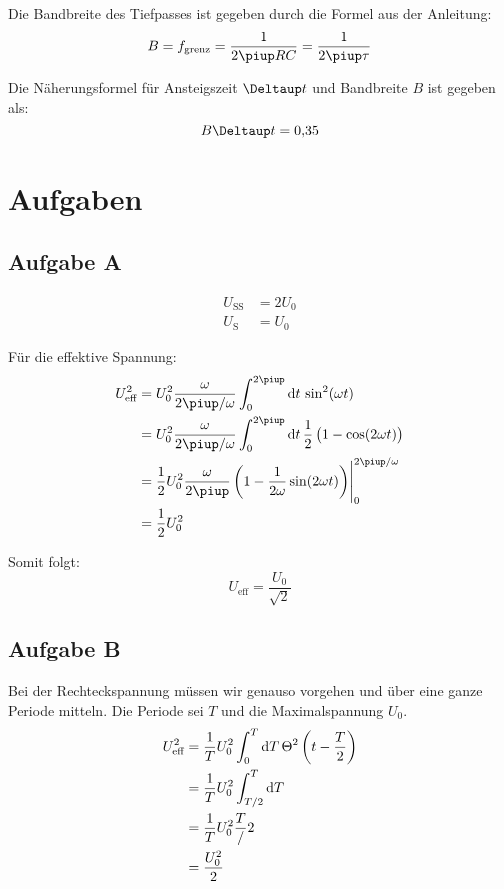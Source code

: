 Die Bandbreite des Tiefpasses ist gegeben durch die Formel aus der Anleitung:
\begin{equation}
	\label{eq:0.3}
	B = f_\text{grenz} = \frac{1}{2\piup RC}
	= \frac{1}{2\piup \tau}
\end{equation}

Die Näherungsformel für Ansteigszeit $\Deltaup t$ und Bandbreite $B$ ist gegeben als:
\begin{equation}
	\label{eq:0.4}
	B \Deltaup t = \num{0.35}
\end{equation}

\section{Aufgaben}

\subsection{Aufgabe A}

\begin{align*}
	U_\text{SS}&=2U_0\\
	U_\text{S}&=U_0
\end{align*}

Für die effektive Spannung:
\begin{align*}
	U_\text{eff}^2
	&= U_0^2 \frac{\omega}{2\piup/\omega} \int_0^{2\piup} \dif t \, \sin^2(\omega t) \\
	&= U_0^2 \frac{\omega}{2\piup/\omega} \int_0^{2\piup} \dif t \, \half \del{1- \cos(2\omega t)} \\
	&= \half U_0^2 \frac{\omega}{2\piup} \eval{\del{1- \frac{1}{2\omega} \sin(2\omega t)}}_0^{2\piup/\omega}  \\
	&= \half U_0^2
\end{align*}

Somit folgt:
\[
	U_\text{eff} = \frac{U_0}{\sqrt{2}}
\]

\subsection{Aufgabe B}

Bei der Rechteckspannung müssen wir genauso vorgehen und über eine ganze Periode mitteln. Die Periode sei $T$ und die Maximalspannung $U_0$.
\begin{align*}
	U_\text{eff}^2
	&= \frac 1T U_0^2 \int_0^T \dif T \, \Theta^2\del{t - \frac T2} \\
	&= \frac 1T U_0^2 \int_{T/2}^T \dif T \\
	&= \frac 1T U_0^2 \frac T/2 \\
	&= \frac{U_0^2}2
\end{align*}

